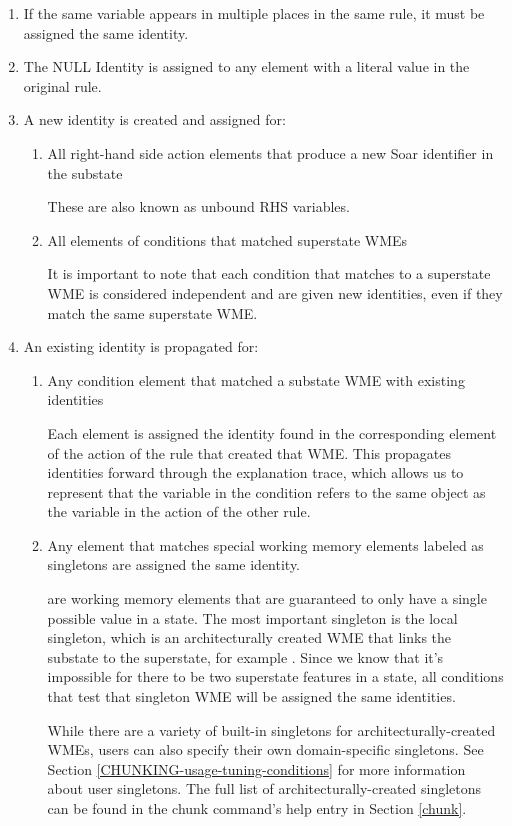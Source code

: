 \begin{enumerate}
	\item If the same variable appears in multiple places in the same rule, it must be assigned the same identity.

	\item The NULL Identity is assigned to any element with a literal value in the original rule.

	\item A new identity is created and assigned for:
	\begin{enumerate}
		\item All right-hand side action elements that produce a new Soar identifier in the substate
	
		These are also known as unbound RHS variables.

		\item All elements of conditions that matched superstate WMEs

		It is important to note that each condition that matches to a superstate WME is considered independent and are given new identities, even if they match the same superstate WME.
	\end{enumerate}
	\item An existing identity is propagated for:

	\begin{enumerate}
		\item Any condition element that matched a substate WME with existing identities

		Each element is assigned the identity found in the corresponding element of the action of the rule that created that WME.  This propagates identities forward through the explanation trace, which allows us to represent that the variable in the condition refers to the same object as the variable in the action of the other rule.

		\item Any element that matches special working memory elements labeled as singletons are assigned the same identity.

		 are working memory elements that are guaranteed to only have a single possible value in a state.  The most important singleton is the local  singleton, which is an architecturally created WME that links the substate to the superstate, for example .  Since we know that it's impossible for there to be two superstate features in a state, all conditions that test that singleton WME will be assigned the same identities.

		While there are a variety of built-in singletons for architecturally-created WMEs, users can also specify their own domain-specific singletons.  See Section \ref{CHUNKING-usage-tuning-conditions} for more information about user singletons.  The full list of architecturally-created singletons can be found in the chunk command's help entry in Section \ref{chunk}.
	\end{enumerate}
\end{enumerate}

